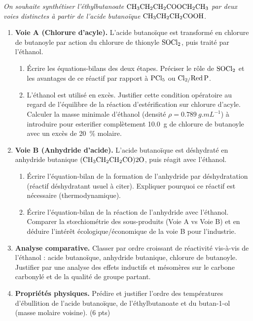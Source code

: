 \documentclass[11pt]{article}
\begin{document}
\begin{exercice}
\emph{On souhaite synthétiser l'éthylbutanoate $\ce{CH3CH2CH2COOCH2CH3}$ par deux voies distinctes à partir de l'acide butanoïque $\ce{CH3CH2CH2COOH}$.}
\begin{enumerate}
    \item \textbf{Voie A (Chlorure d'acyle).} L'acide butanoïque est transformé en chlorure de butanoyle par action du chlorure de thionyle $\ce{SOCl2}$, puis traité par l'éthanol.
    \begin{enumerate}
        \item Écrire les équations-bilans des deux étapes. Préciser le rôle de $\ce{SOCl2}$ et les avantages de ce réactif par rapport à $\ce{PCl5}$ ou $\ce{Cl2/Red P}$.
        \item L'éthanol est utilisé en excès. Justifier cette condition opératoire au regard de l'équilibre de la réaction d'estérification sur chlorure d'acyle. Calculer la masse minimale d'éthanol (densité $\rho = \SI{0,789}{g.mL^{-1}}$) à introduire pour esterifier complètement \SI{10,0}{g} de chlorure de butanoyle avec un excès de \SI{20}{\%} molaire.
    \end{enumerate}
    \item \textbf{Voie B (Anhydride d'acide).} L'acide butanoïque est déshydraté en anhydride butanique $(\ce{CH3CH2CH2CO})2\ce{O}$, puis réagit avec l'éthanol.
    \begin{enumerate}
        \item Écrire l'équation-bilan de la formation de l'anhydride par déshydratation (réactif déshydratant usuel à citer). Expliquer pourquoi ce réactif est nécessaire (thermodynamique).
        \item Écrire l'équation-bilan de la réaction de l'anhydride avec l'éthanol. Comparer la stœchiométrie des sous-produits (Voie A vs Voie B) et en déduire l'intérêt écologique/économique de la voie B pour l'industrie.
    \end{enumerate}
    \item \textbf{Analyse comparative.} Classer par ordre croissant de réactivité vis-à-vis de l'éthanol : acide butanoïque, anhydride butanique, chlorure de butanoyle. Justifier par une analyse des effets inductifs et mésomères sur le carbone carbonylé et de la qualité de groupe partant.
    \item \textbf{Propriétés physiques.} Prédire et justifier l'ordre des températures d'ébullition de l'acide butanoïque, de l'éthylbutanoate et du butan-1-ol (masse molaire voisine). \hfill (6 pts)
\end{enumerate}
\end{exercice}
\end{document}
